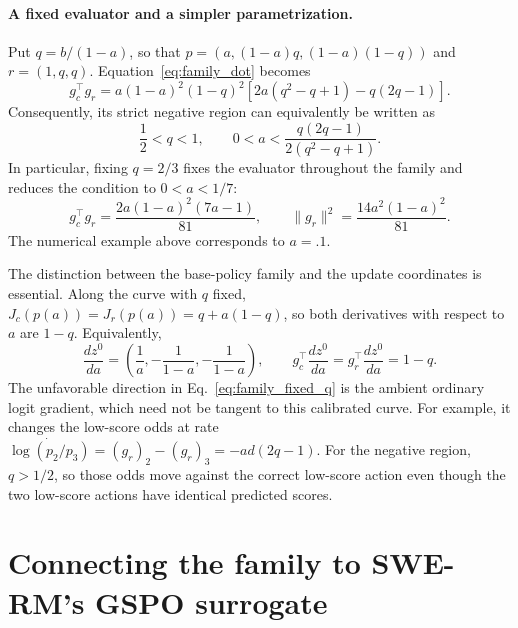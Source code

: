 \documentclass[11pt]{article}
\begin{document}
\paragraph{A fixed evaluator and a simpler parametrization.}
Put $q=b/(1-a)$, so that
$p=(a,(1-a)q,(1-a)(1-q))$ and $r=(1,q,q)$.
Equation~\eqref{eq:family_dot} becomes
\begin{equation}
 g_c^\top g_r
 =a(1-a)^2(1-q)^2
 \left[2a(q^2-q+1)-q(2q-1)\right].
 \label{eq:family_q_dot}
\end{equation}
Consequently, its strict negative region can equivalently be written as
\begin{equation}
 \frac12<q<1,\qquad
 0<a<\frac{q(2q-1)}{2(q^2-q+1)}.
 \label{eq:family_q_region}
\end{equation}
In particular, fixing $q=2/3$ fixes the evaluator throughout the family and
reduces the condition to $0<a<1/7$:
\begin{equation}
 g_c^\top g_r=\frac{2a(1-a)^2(7a-1)}{81},\qquad
 \lVert g_r\rVert^2=\frac{14a^2(1-a)^2}{81}.
 \label{eq:family_fixed_q}
\end{equation}
The numerical example above corresponds to $a=.1$.

The distinction between the base-policy family and the update coordinates is
essential. Along the curve with $q$ fixed,
$J_c(p(a))=J_r(p(a))=q+a(1-q)$, so both derivatives with respect to $a$
are $1-q$. Equivalently,
\[
 \frac{dz^0}{da}=\left(\frac1a,-\frac1{1-a},-\frac1{1-a}\right),\qquad
 g_c^\top\frac{dz^0}{da}=g_r^\top\frac{dz^0}{da}=1-q.
\]
The unfavorable direction in Eq.~\eqref{eq:family_fixed_q} is the ambient
ordinary logit gradient, which need not be tangent to this calibrated curve.
For example, it changes the low-score odds at rate
$\dot{\log(p_2/p_3)}=(g_r)_2-(g_r)_3=-ad(2q-1)$.
For the negative region, $q>1/2$, so those odds move against the correct
low-score action even though the two low-score actions have identical
predicted scores.

\section{Connecting the family to SWE-RM's GSPO surrogate}
\label{sec:gspo}
\end{document}
